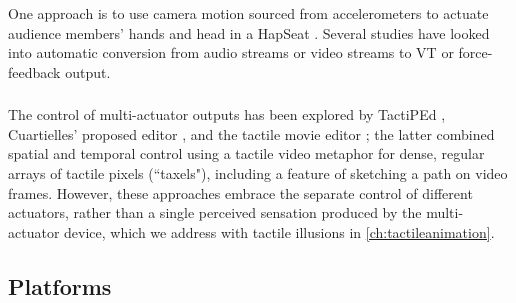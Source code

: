 \subsubsection{}
One approach is to use camera motion sourced from accelerometers \cite{Danieau2012} to actuate audience members' hands and head in a HapSeat \cite{Danieau2013a,Danieau2012a}.
Several studies have looked into automatic conversion from audio streams \cite{Lee2013,Chang2005,Hwang2014} or video streams \cite{Kim2014} to VT or force-feedback output.

\subsubsection{}
The control of multi-actuator outputs has been explored by TactiPEd \cite{Paneels2013}, Cuartielles' proposed editor \cite{Cuartielles2012}, and the tactile movie editor \cite{Kim2009}; the latter combined spatial and temporal control using a tactile video metaphor for dense, regular arrays of tactile pixels (``taxels"), including a feature of sketching a path on video frames. 
However, these approaches embrace the separate control of different actuators, rather than a single perceived sensation produced by the multi-actuator device, which we address with tactile illusions in \autoref{ch:tactileanimation}.




\subsection{Platforms}

